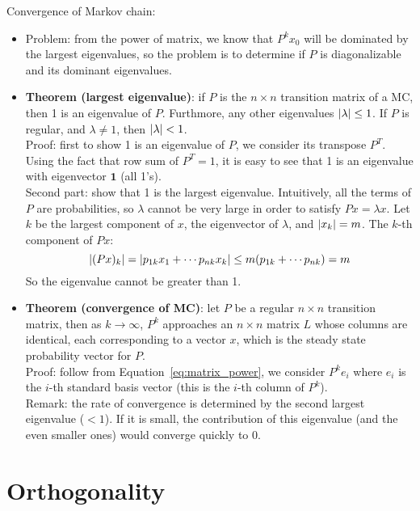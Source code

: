 \documentclass{report}
\begin{document}
Convergence of Markov chain: 
\begin{itemize}
\item Problem: from the power of matrix, we know that $P^k x_0$ will be dominated by the largest eigenvalues, so the problem is to determine if $P$ is diagonalizable and its dominant eigenvalues. 

\item \textbf{Theorem (largest eigenvalue)}: if $P$ is the $n \times n$ transition matrix of a MC, then 1 is an eigenvalue of $P$. Furthmore, any other eigenvalues $\lvert\lambda\rvert \leq 1$. If $P$ is regular, and $\lambda \neq 1$, then $\lvert\lambda\rvert < 1$. \\
Proof: first to show 1 is an eigenvalue of $P$, we consider its transpose $P^T$. Using the fact that row sum of $P^T = 1$, it is easy to see that 1 is an eigenvalue with eigenvector $\mathbf{1}$ (all 1's). \\
Second part: show that 1 is the largest eigenvalue. Intuitively, all the terms of $P$ are probabilities, so $\lambda$ cannot be very large in order to satisfy $Px = \lambda x$. Let $k$ be the largest component of $x$,  the eigenvector of $\lambda$, and $\lvert x_k\rvert = m$. The $k$-th component of $Px$: 
\begin{equation}
\lvert(Px)_k\rvert = \lvert p_{1k} x_1 + \cdots p_{nk} x_k\rvert \leq m (p_{1k} + \cdots p_{nk}) = m
\end{equation}
So the eigenvalue cannot be greater than 1. 

\item \textbf{Theorem (convergence of MC)}: let $P$ be a regular $n \times n$ transition matrix, then as $k \rightarrow \infty$, $P^k$ approaches an $n \times n$ matrix $L$ whose columns are identical, each corresponding to a vector $x$, which is the steady state probability vector for $P$. \\
Proof: follow from Equation~\ref{eq:matrix_power}, we consider $P^k e_i$ where $e_i$ is the $i$-th standard basis vector (this is the $i$-th column of $P^k$). \\
Remark: the rate of convergence is determined by the second largest eigenvalue ($<1$). If it is small, the contribution of this eigenvalue (and the even smaller ones) would converge quickly to 0.  
\end{itemize}

\section{Orthogonality}
\end{document}
